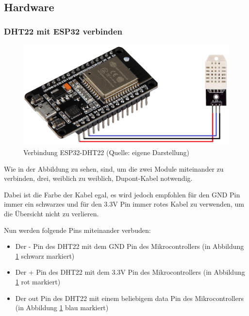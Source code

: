 \subsection{Hardware}

\subsubsection{DHT22 mit ESP32 verbinden}
\begin{figure}[H]
    \begin{center}
        \includegraphics[scale=0.36]{images/DHT22-ESP32-Connection.png}
        \caption{Verbindung ESP32-DHT22 (Quelle: eigene Darstellung)}
        \label{abb:esp32-dht22}
    \end{center}
\end{figure}


Wie in der Abbildung zu sehen, sind, um die zwei Module miteinander zu verbinden, drei, weiblich zu weiblich, Dupont-Kabel notwendig.

Dabei ist die Farbe der Kabel egal, es wird jedoch empfohlen für den GND Pin immer ein schwarzes und für den 3.3V Pin immer rotes Kabel zu verwenden, um die Übersicht nicht zu verlieren.

Nun werden folgende Pins miteinander verbuden:
\begin{itemize}
    \item Der - Pin des DHT22 mit dem GND Pin des Mikrocontrollers (in Abbildung \ref{abb:esp32-dht22} schwarz markiert)
    \item Der + Pin des DHT22 mit dem 3.3V Pin des Mikrocontrollers (in Abbildung \ref{abb:esp32-dht22} rot markiert)
    \item Der out Pin des DHT22 mit einem beliebigem data Pin des Mikrocontrollers (in Abbildung \ref{abb:esp32-dht22} blau markiert)
\end{itemize}
\pagebreak

